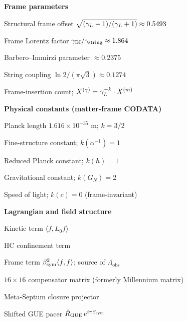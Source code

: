 \begin{minipage}[t]{0.48\textwidth}
\medskip
\noindent\textbf{Frame parameters}
\begin{description}[leftmargin=1.8em, labelindent=0pt, itemsep=1pt]
 \item[$\bsym$] Structural frame offset $\sqrt{(\gamma_L-1)/(\gamma_L+1)}\approx 0.5493$
 \item[$\gL$] Frame Lorentz factor $\gamma_{\mathrm{BI}}/\gamma_{\mathrm{string}}\approx 1.864$
 \item[$\gBI$] Barbero--Immirzi parameter $\approx 0.2375$
 \item[$\gstring$] String coupling $\ln 2/(\pi\sqrt{3})\approx 0.1274$
 \item[$k(X)$] Frame-insertion count; $X^{(\gamma)}=\gamma_L^{-k}\cdot X^{(m)}$
\end{description}
\end{minipage}
\hfill
\begin{minipage}[t]{0.48\textwidth}
\small
\noindent\textbf{Physical constants (matter-frame CODATA)}
\begin{description}[leftmargin=1.8em, labelindent=0pt, itemsep=1pt]
 \item[$\lP$] Planck length $1.616\times10^{-35}$ m; $k=3/2$
 \item[$\alpha$] Fine-structure constant; $k(\alpha^{-1})=1$
 \item[$\hbar$] Reduced Planck constant; $k(\hbar)=1$
 \item[$G_N$] Gravitational constant; $k(G_N)=2$
 \item[$c$] Speed of light; $k(c)=0$ (frame-invariant)
\end{description}

\medskip
\noindent\textbf{Lagrangian and field structure}
\begin{description}[leftmargin=1.8em, labelindent=0pt, itemsep=1pt]
 \item[$\mathcal{L}_{\mathrm{kin}}$] Kinetic term $\langle f,L_0 f\rangle$
 \item[$\mathcal{L}_{\mathrm{HC}}$] HC confinement term
 \item[$\mathcal{L}_{\mathrm{frame}}$] Frame term $\beta_{\mathrm{sym}}^2\langle f,f\rangle$; source of $\Lambda_{\mathrm{obs}}$
 \item[$\mathcal{M}_{16}$] $16\times16$ compensator matrix (formerly Millennium matrix)
 \item[$\hat P_{C_7}$] Meta-Septum closure projector
 \item[$\hat{\mathcal{R}}_\beta$] Shifted GUE pacer $\hat R_{\mathrm{GUE}}\,e^{i\pi\beta_{\mathrm{sym}}}$
\end{description}


\end{minipage}
